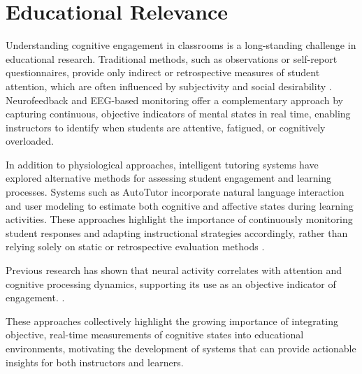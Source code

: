\section{Educational Relevance}\label{sect:edurel}
Understanding cognitive engagement in classrooms is a long-standing challenge in educational research. Traditional methods, such as observations or self-report questionnaires, provide only indirect or retrospective measures of student attention, which are often influenced by subjectivity and social desirability \cite{DMello2013}. Neurofeedback and EEG-based monitoring offer a complementary approach by capturing continuous, objective indicators of mental states in real time, enabling instructors to identify when students are attentive, fatigued, or cognitively overloaded.


In addition to physiological approaches, intelligent tutoring systems have
explored alternative methods for assessing student engagement and learning
processes. Systems such as AutoTutor incorporate natural language interaction
and user modeling to estimate both cognitive and affective states during learning
activities. These approaches highlight the importance of continuously monitoring
student responses and adapting instructional strategies accordingly, rather than
relying solely on static or retrospective evaluation methods \cite{DMello2013}.


Previous research has shown that neural activity correlates with attention and cognitive processing dynamics, supporting its use as an objective indicator of engagement. \cite{Dmochowski2014}.


These approaches collectively highlight the growing importance of integrating objective, real-time measurements of cognitive states into educational environments, motivating the development of systems that can provide actionable insights for both instructors and learners.